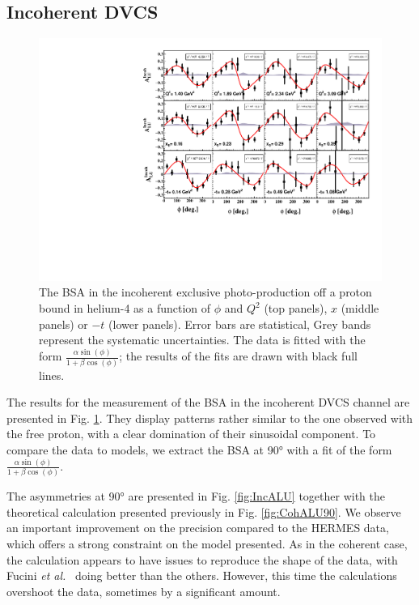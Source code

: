 \documentclass[aps,prc,preprint,superscriptaddress]{revtex4}
\begin{document}
\subsection{Incoherent DVCS}

\begin{figure}[bp!]
\center
\includegraphics[width=15cm]{fig3/incoherent_ALU_phi.pdf}
	\caption{The BSA in the incoherent exclusive photo-production off a proton bound in
	helium-4 as a function of $\phi$ and $Q^2$ 
	(top panels), $x$ (middle panels) or $-t$ (lower panels). Error bars are  
	statistical, Grey bands represent the systematic uncertainties. The data is fitted with the 
	form $\frac{\alpha \sin(\phi)}{1+\beta \cos(\phi)}$; the results of the 
	fits are drawn with black full lines.}
\label{fig:InCohALUphi}
\end{figure}

The results for the measurement of the BSA in the incoherent DVCS channel are presented in
Fig. \ref{fig:InCohALUphi}. They display patterns rather similar to the one observed with the 
free proton, with a clear domination of their sinusoidal component. To compare the data to 
models, we extract the BSA at 90° with a fit of the form $\frac{\alpha \sin(\phi)}{1+\beta \cos(\phi)}$. 

The asymmetries at 90° are presented in Fig. \ref{fig:IncALU} together with the theoretical
calculation presented previously in Fig. \ref{fig:CohALU90}. We observe an important improvement
on the precision compared to 
the HERMES data, which offers a strong constraint on the model presented. As in the
coherent case, the calculation appears to have issues to reproduce the shape of the data,
with Fucini {\it et al.}~\cite{Fucini:2019xlc} doing better than the others.
However, this time the calculations overshoot the data, sometimes by a significant amount.
\end{document}
